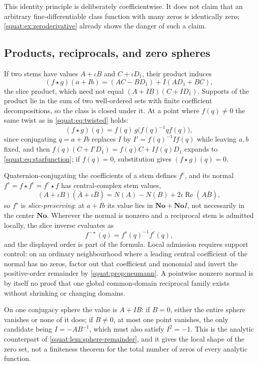 \documentclass[11pt,letterpaper]{article}
\numberwithin{equation}{section}
\theoremstyle{definition}
\theoremstyle{remark}
\newcommand{\No}{\mathbf{No}}
\newcommand{\Rea}{\operatorname{Re}}
\begin{document}
This identity principle is deliberately coefficientwise. It does not claim that an
arbitrary fine-differentiable class function with many zeros is identically zero;
\cref{squat:ex:zeroderivative} already shows the danger of such a claim.

\subsection{Products, reciprocals, and zero spheres}\label{squat:sub:starfunctions}
If two stems have values $A+\iota B$ and $C+\iota D_1$, their product induces
\begin{equation}\label{squat:eq:starfunction}
 (f\star g)(a+Ib)=(AC-BD_1)+I(AD_1+BC),
\end{equation}
the slice product, which need not equal $(A+IB)(C+ID_1)$. Supports of the product lie in
the sum of two well-ordered sets with finite coefficient decompositions, so the class is
closed under it. At a point where $f(q)\ne0$ the same twist as in
\cref{squat:eq:twisted} holds:
\begin{equation}\label{squat:eq:twistedfunction}
 (f\star g)(q)=f(q)\,g\bigl(f(q)^{-1}qf(q)\bigr),
\end{equation}
since conjugating $q=a+Ib$ replaces $I$ by $I'=f(q)^{-1}If(q)$ while leaving $a,b$ fixed,
and then $f(q)(C+I'D_1)=f(q)C+If(q)D_1$ expands to \cref{squat:eq:starfunction}; if
$f(q)=0$, substitution gives $(f\star g)(q)=0$.

Quaternion-conjugating the coefficients of a stem defines $f^c$, and its normal
$f^s=f\star f^c=f^c\star f$ has central-complex stem values,
\[
 (A+\iota B)(\bar A+\iota\bar B)=N(A)-N(B)+2\iota\Rea(A\bar B),
\]
so $f^s$ is \emph{slice-preserving}: at $a+Ib$ its value lies in $\No+\No I$, not
necessarily in the center $\No$. Wherever the normal is nonzero and a reciprocal stem is
admitted locally, the slice inverse evaluates as
\begin{equation}\label{squat:eq:starinverse}
 f^{-\star}(q)=f^s(q)^{-1}f^c(q),
\end{equation}
and the displayed order is part of the formula. Local admission requires support control:
on an ordinary neighbourhood where a leading central coefficient of the normal has no
zeros, factor out that coefficient and monomial and invert the positive-order remainder by
\cref{squat:prop:neumann}. A pointwise nonzero normal is by itself no proof that one global
common-domain reciprocal family exists without shrinking or changing domains.

On one conjugacy sphere the value is $A+IB$: if $B=0$, either the entire sphere vanishes or
none of it does; if $B\ne0$, at most one point vanishes, the only candidate being
$I=-AB^{-1}$, which must also satisfy $I^2=-1$. This is the analytic counterpart of
\cref{squat:lem:sphere-remainder}, and it gives the local shape of the zero set, not a
finiteness theorem for the total number of zeros of every analytic function.
\end{document}
